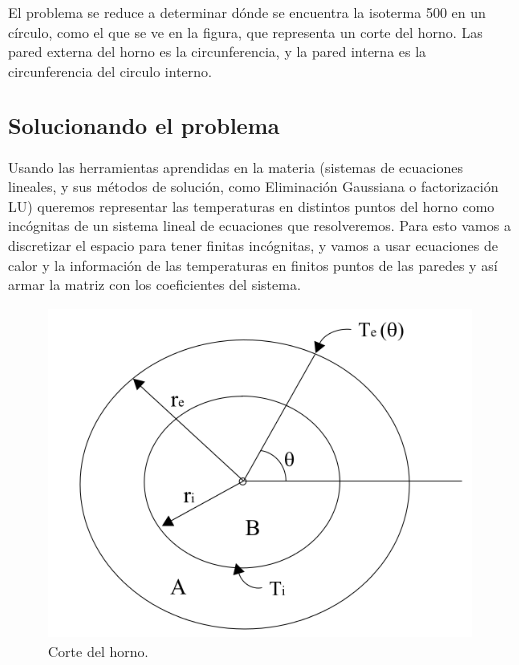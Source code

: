 El problema se reduce a determinar dónde se encuentra la isoterma 500 en un círculo, como el que se ve en la figura, que representa un corte del horno. Las pared externa del horno es la circunferencia, y la pared interna es la circunferencia del circulo interno.



\subsection{Solucionando el problema}

Usando las herramientas aprendidas en la materia (sistemas de ecuaciones lineales, y sus métodos de solución, como Eliminación Gaussiana o factorización LU) queremos representar las temperaturas en distintos puntos del horno como incógnitas de un sistema lineal de ecuaciones que resolveremos.
 Para esto vamos a discretizar el espacio para tener finitas incógnitas, y vamos a usar ecuaciones de calor y la información de las temperaturas en finitos puntos de las paredes y así armar la matriz con los coeficientes del sistema.\\



\begin{figure}
  \vspace{-20pt}
  \begin{center}
    \includegraphics[scale= 0.4]{../Horno.png}
  \end{center}
  \vspace{-20pt}
  \caption{Corte del horno.}
  \vspace{-10pt}
  \label{fig:corteHorno}
\end{figure}


